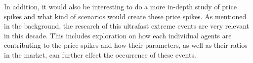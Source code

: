 In addition, it would also be interesting to do a more in-depth study of price spikes and what kind of scenarios would create these price spikes. As mentioned in the background, the research of this ultrafast extreme events are very relevant in this decade. This includes exploration on how each individual agents are contributing to the price spikes and how their parameters, as well as their ratios in the market, can further effect the occurrence of these events.  